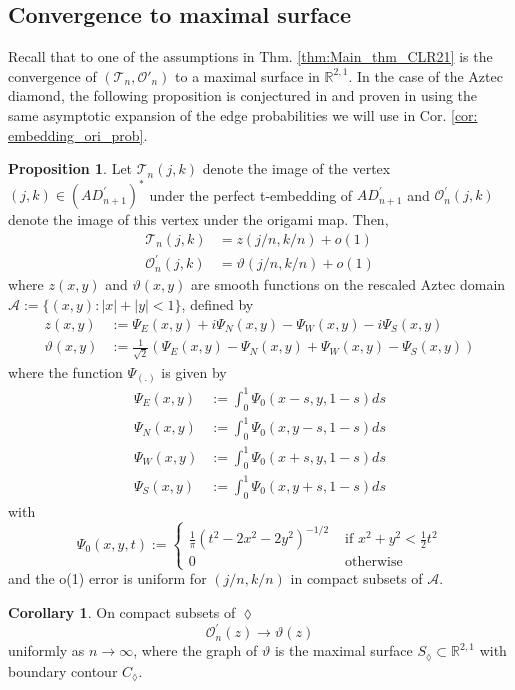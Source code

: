\documentclass[12pt]{amsart}
\newcommand{\R}{{\mathbb R}}
\numberwithin{equation}{section}
\theoremstyle{definition}
\newtheorem{prop}[thm]{Proposition}
\newtheorem{cor}[thm]{Corollary}
\begin{document}
\subsection{Convergence to maximal surface}
Recall that to one of the assumptions in Thm. \ref{thm:Main_thm_CLR21} is the convergence of $(\mathcal{T}_n,\mathcal{O}'_n)$ to a maximal surface in $\R^{2,1}$. In the case of the Aztec diamond, the following proposition is conjectured in \cite{chelkak2021fluctuations} and proven in \cite{tower_AD_perfect} using the same asymptotic expansion of the edge probabilities we will use in Cor. \ref{cor: embedding_ori_prob}.
\begin{prop}
    \label{prop: convergence_max_surface}
     Let $\mathcal{T}_n(j, k)$ denote the image of the vertex $(j, k) \in\left(AD_{n+1}^{\prime}\right)^*$ under the perfect t-embedding of $AD_{n+1}^{\prime}$ and $\mathcal{O}_n^{\prime}(j, k)$ denote the image of this vertex under the origami map. Then,
$$
\begin{aligned}
\mathcal{T}_n(j, k) & =z(j / n, k / n)+o(1) \\
\mathcal{O}_n^{\prime}(j, k) & =\vartheta(j / n, k / n)+o(1)
\end{aligned}
$$
where $z(x, y)$ and $\vartheta(x, y)$ are smooth functions on the rescaled Aztec domain $\mathcal A:=\{(x,y): |x|+|y|<1\}$, defined by
$$
\begin{aligned}
z(x, y) & :=\Psi_E(x, y)+i \Psi_N(x, y)-\Psi_W(x, y)-i \Psi_S(x, y) \\
\vartheta(x, y) & :=\frac{1}{\sqrt{2}}\left(\Psi_E(x, y)-\Psi_N(x, y)+\Psi_W(x, y)-\Psi_S(x, y)\right)
\end{aligned}
$$
where the function $\Psi_{(.)}$ is given by
$$
\begin{aligned}
\Psi_E(x, y)&:=\int_0^1 \Psi_0(x-s, y, 1-s) d s \\
\Psi_N(x, y)&:=\int_0^1 \Psi_0(x, y-s, 1-s) d s \\
\Psi_W(x, y)&:=\int_0^1 \Psi_0(x+s, y, 1-s) d s \\
\Psi_S(x, y)&:=\int_0^1 \Psi_0(x, y+s, 1-s) d s 
\end{aligned}
$$
with
$$
\Psi_0(x, y, t):= \begin{cases}\frac{1}{\pi}\left(t^2-2 x^2-2 y^2\right)^{-1 / 2} & \text { if } x^2+y^2<\frac{1}{2} t^2 \\ 0 & \text { otherwise }\end{cases}
$$
and the o(1) error is uniform for $(j / n, k / n)$ in compact subsets of $\mathcal{A}$.
\end{prop}
\begin{cor}
    \label{cor: AD_ori_convergence}
 On compact subsets of $\lozenge$
$$
\mathcal{O}_n^{\prime}(z) \rightarrow \vartheta(z)
$$
uniformly as $n\to \infty$, where the graph of $\vartheta$ is the maximal surface $S_{\lozenge} \subset \mathbb{R}^{2,1}$ with boundary contour $C_{\lozenge}$.
\end{cor}
\end{document}
